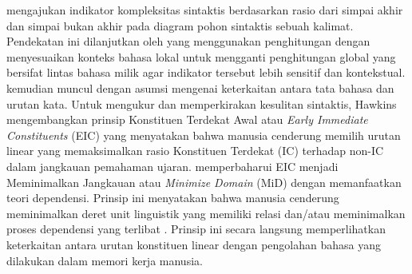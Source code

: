 \cite{miller1963finitary} mengajukan indikator kompleksitas sintaktis berdasarkan rasio dari simpai akhir dan simpai bukan akhir pada diagram pohon sintaktis sebuah kalimat. Pendekatan ini dilanjutkan oleh \cite{frazier1985syntactic} yang menggunakan penghitungan dengan menyesuaikan konteks bahasa lokal untuk mengganti penghitungan global yang bersifat lintas bahasa milik \cite{miller1963finitary} agar indikator tersebut lebih sensitif dan kontekstual. \cite{hawkins1994performance} kemudian muncul dengan asumsi mengenai keterkaitan antara tata bahasa dan urutan kata. Untuk mengukur dan memperkirakan kesulitan sintaktis, Hawkins mengembangkan prinsip Konstituen Terdekat Awal atau \textit{Early Immediate Constituents} (EIC) yang menyatakan bahwa manusia cenderung memilih urutan linear yang memaksimalkan rasio Konstituen Terdekat (IC) terhadap non-IC dalam jangkauan pemahaman ujaran. \cite{hawkins2004efficiency} memperbaharui EIC menjadi Meminimalkan Jangkauan atau \textit{Minimize Domain} (MiD) dengan memanfaatkan teori dependensi. Prinsip ini menyatakan bahwa manusia cenderung meminimalkan deret unit linguistik yang memiliki relasi dan/atau meminimalkan proses dependensi yang terlibat \citep{hawkins2004efficiency}. Prinsip ini secara langsung memperlihatkan keterkaitan antara urutan konstituen linear dengan pengolahan bahasa yang dilakukan dalam memori kerja manusia.

